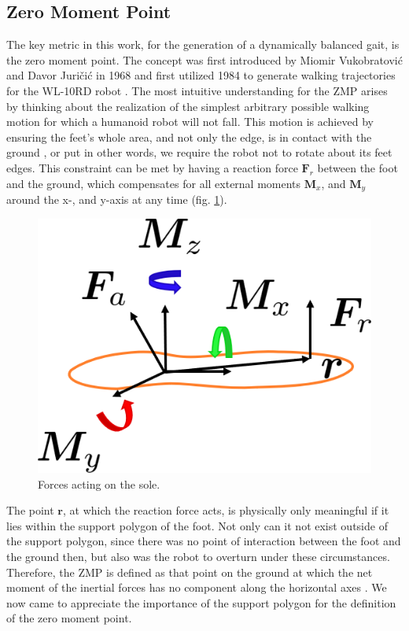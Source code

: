 \FloatBarrier
\subsection{Zero Moment Point}
\label{sec::211_zmp}
The key metric in this work, for the generation of a dynamically balanced gait, is the zero moment point. The concept was first introduced by Miomir Vukobratovi\'{c} and Davor Juri\v{c}i\'{c} in 1968 \cite{vukobratovic1968contribution}\cite{vukobratovic1969contribution} and first utilized 1984 to generate walking trajectories for the WL-10RD robot \cite{yamaguchi1993development}. The most intuitive understanding for the ZMP arises by thinking about the realization of the simplest arbitrary possible walking motion for which a humanoid robot will not fall. This motion is achieved by ensuring the feet's whole area, and not only the edge, is in contact with the ground \cite{vukobratovic2004zero}, or put in other words, we require the robot not to rotate about its feet edges. This constraint can be met by having a reaction force $\bm{F}_r$ between the foot and the ground, which compensates for all external moments $\bm{M}_x$, and $\bm{M}_y$ around the x-, and y-axis at any time (fig. \ref{fig::211_zmp}).
\begin{figure}[h!]
	\centering
	\includegraphics[scale=.5]{chapters/02_background/img/zero_moment_point.png}
	\caption{Forces acting on the sole.}
	\label{fig::211_zmp}
\end{figure}
The point $\bm{r}$, at which the reaction force acts, is physically only meaningful if it lies within the support polygon of the foot. Not only can it not exist outside of the support polygon, since there was no point of interaction between the foot and the ground then, but also was the robot to overturn under these circumstances. Therefore, the ZMP is defined as that point on the ground at which the net moment of the inertial forces has no component along the horizontal axes \cite{hirai1998development}\cite{dasgupta1999making}. We now came to appreciate the importance of the support polygon for the definition of the zero moment point. 
